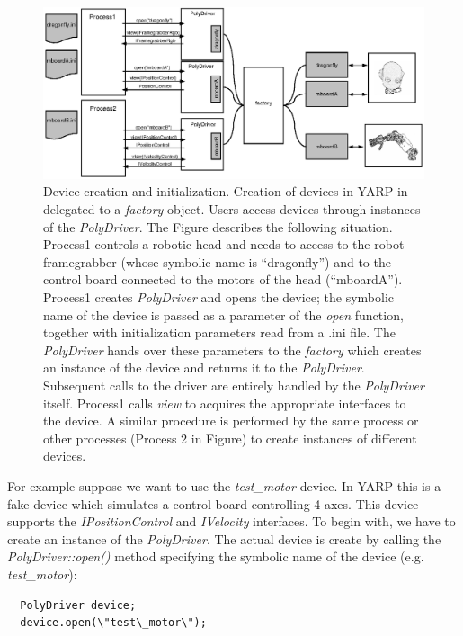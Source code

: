 \begin{figure}[tbp]
\centerline{
\includegraphics[width=20cm]{fig-devices4.eps}
}
\caption{Device creation and initialization. Creation of 
devices in YARP in delegated to a \emph{factory} object. Users 
access devices through instances of the \emph{PolyDriver}. The 
Figure describes the following situation. Process1 controls a robotic
head and needs to access to the robot framegrabber (whose symbolic name 
is ``dragonfly'') and to the control board connected to the motors of 
the head (``mboardA''). Process1 creates \emph{PolyDriver} and opens 
the device; the symbolic name of the device is passed as a parameter
of the \emph{open} function, together with initialization parameters 
read from a .ini file. The \emph{PolyDriver} hands over these parameters 
to the \emph{factory} which creates an instance of the device and returns
it to the \emph{PolyDriver}. Subsequent calls to the driver are entirely 
handled by the \emph{PolyDriver} itself. Process1 calls \emph{view} to 
acquires the appropriate interfaces to the device. A similar procedure 
is performed by the same process or other processes (Process 2 in Figure) 
to create instances of different devices.}\label{fig:devices4}
\end{figure}

For example suppose we want to use the \emph{test\_motor} device. In YARP this 
is a fake device which simulates a control board controlling 4 axes. This device 
supports the \emph{IPositionControl} and \emph{IVelocity} interfaces. To begin with, 
we have to create an instance of the \emph{PolyDriver}. The actual device is create 
by calling the \emph{PolyDriver::open()} method specifying the symbolic name of the 
device (e.g. \emph{test\_motor}):

\begin{verbatim}
  PolyDriver device;
  device.open(\"test\_motor\");
\end{verbatim}


